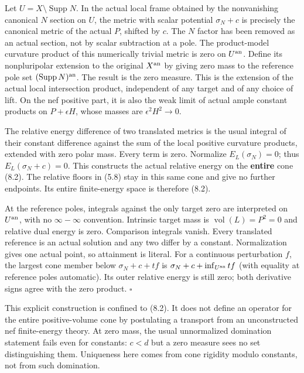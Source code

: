 \documentclass[
  10pt,
]{article}
\begin{document}
Let \(U=X\setminus\operatorname{Supp}N\). In the actual local frame
obtained by the nonvanishing canonical \(N\) section on \(U\), the
metric with scalar potential \(\sigma_N+c\) is precisely the canonical
metric of the actual \(P\), shifted by \(c\). The \(N\) factor has been
removed as an actual section, not by scalar subtraction at a pole. The
product-model curvature product of this numerically trivial metric is
zero on \(U^{\rm an}\). Define its nonpluripolar extension to the
original \(X^{\rm an}\) by giving zero mass to the reference pole set
\((\operatorname{Supp}N)^{\rm an}\). The result is the zero measure.
This is the extension of the actual local intersection product,
independent of any target and of any choice of lift. On the nef positive
part, it is also the weak limit of actual ample constant products on
\(P+\epsilon H\), whose masses are \(\epsilon^2H^2\to0\).

The relative energy difference of two translated metrics is the usual
integral of their constant difference against the sum of the local
positive curvature products, extended with zero polar mass. Every term
is zero. Normalize \(E_L(\sigma_N)=0\); thus \(E_L(\sigma_N+c)=0\). This
constructs the actual relative energy on the \textbf{entire} cone (8.2).
The relative floors in (5.8) stay in this same cone and give no further
endpoints. Its entire finite-energy space is therefore (8.2).

At the reference poles, integrals against the only target zero are
interpreted on \(U^{\rm an}\), with no \(\infty-\infty\) convention.
Intrinsic target mass is \(\operatorname{vol}(L)=P^2=0\) and relative
dual energy is zero. Comparison integrals vanish. Every translated
reference is an actual solution and any two differ by a constant.
Normalization gives one actual point, so attainment is literal. For a
continuous perturbation \(f\), the largest cone member below
\(\sigma_N+c+tf\) is \(\sigma_N+c+\inf_{U^{\rm an}}tf\) (with equality
at reference poles automatic). Its outer relative energy is still zero;
both derivative signs agree with the zero product. \(\square\)

This explicit construction is confined to (8.2). It does not define an
operator for the entire positive-volume cone by postulating a transport
from an unconstructed nef finite-energy theory. At zero mass, the usual
unnormalized domination statement fails even for constants: \(c<d\) but
a zero measure sees no set distinguishing them. Uniqueness here comes
from cone rigidity modulo constants, not from such domination.
\end{document}
